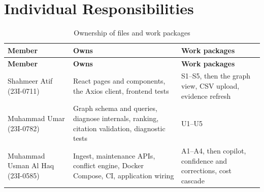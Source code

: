 \section{Individual Responsibilities}
\begin{longtable}{p{}p{}p{}}
\caption{Ownership of files and work packages}\label{tab:owners}\\
\toprule \textbf{Member} & \textbf{Owns} & \textbf{Work packages} \\ \midrule \endfirsthead
\toprule \textbf{Member} & \textbf{Owns} & \textbf{Work packages} \\ \midrule \endhead
Shahmeer Atif (23I-0711) & React pages and components, the Axios client, frontend tests & S1--S5, then the graph view, CSV upload, evidence refresh \\
Muhammad Umar (23I-0782) & Graph schema and queries, diagnose internals, ranking, citation validation, diagnostic tests & U1--U5 \\
Muhammad Usman Al Haq (23I-0585) & Ingest, maintenance APIs, conflict engine, Docker Compose, CI, application wiring & A1--A4, then copilot, confidence and corrections, cost cascade \\
\bottomrule
\end{longtable}

